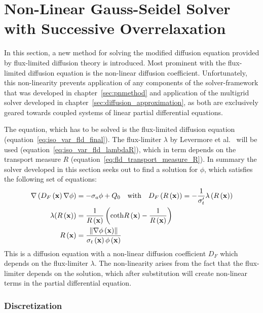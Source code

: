
\section{Non-Linear Gauss-Seidel Solver with Successive Overrelaxation}
\label{sec:fld_solver}

In this section, a new method for solving the modified diffusion equation provided by flux-limited diffusion theory is introduced. Most prominent with the flux-limited diffusion equation is the non-linear diffusion coefficient. Unfortunately, this non-linearity prevents application of any components of the solver-framework that was developed in chapter~\ref{sec:pnmethod} and application of the multigrid solver developed in chapter~\ref{sec:diffusion_approximation}, as both are exclusively geared towards coupled systems of linear partial differential equations.

The equation, which has to be solved is the flux-limited diffusion equation (equation~\ref{eq:iso_var_fld_final}). The flux-limiter $\lambda$ by Levermore et al.~\cite{Levermore81} will be used (equation~\ref{eq:iso_var_fld_lambdaR}), which in term depends on the transport measure $R$ (equation~\ref{eq:fld_transport_measure_R}). In summary the solver developed in this section seeks out to find a solution for $\phi$, which satisfies the following set of equations:
\begin{align}
\nabla\left(D_F\left(\boldsymbol{\mathbf{x}}\right)\nabla\phi\right) &= -\sigma_a\phi + Q_0
\quad \text{with}\quad
D_F\left(R\left(\boldsymbol{\mathbf{x}}\right)\right) = -\frac{1}{\sigma_t'}\lambda\left(R\left(\boldsymbol{\mathbf{x}}\right)\right)
\label{eq:fld_solver_diffusion_equation}
\\
\lambda(R\left(\boldsymbol{\mathbf{x}}\right)) &= \frac{1}{R\left(\boldsymbol{\mathbf{x}}\right)}\left(\mathbf{\operatorname{coth}}R\left(\boldsymbol{\mathbf{x}}\right) - \frac{1}{R\left(\boldsymbol{\mathbf{x}}\right)}\right)
\label{eq:fld_solver_flux_limiter}
\\
R\left(\boldsymbol{\mathbf{x}}\right) &= \frac{\left\lVert\nabla\phi\left(\boldsymbol{\mathbf{x}}\right)\right\rVert}{\sigma_t\left(\boldsymbol{\mathbf{x}}\right)\phi\left(\boldsymbol{\mathbf{x}}\right)}
\label{eq:fld_solver_transport_measure_R}
\end{align}
This is a diffusion equation with a non-linear diffusion coefficient $D_F$ which depends on the flux-limiter $\lambda$. The non-linearity arises from the fact that the flux-limiter depends on the solution, which after substitution will create non-linear terms in the partial differential equation.

\subsubsection*{Discretization}

